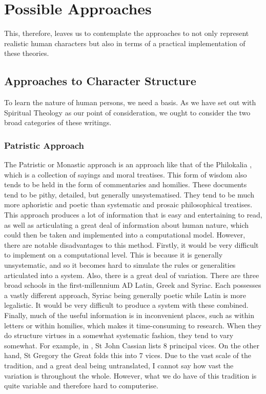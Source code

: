 \documentclass[12pt]{article}
\begin{document}
\section{Possible Approaches}
This, therefore, leaves us to contemplate the approaches to not only represent realistic human characters but also in terms of a practical implementation of these theories. 
\subsection{Approaches to Character Structure}
To learn the nature of human persons, we need a basis. As we have set out with Spiritual Theology as our point of consideration, we ought to consider the two broad categories of these writings.
\subsubsection{Patristic Approach}
The Patristic or Monastic approach is an approach like that of the Philokalia \cite{1983philokalia}, which is a collection of sayings and moral treatises. This form of wisdom also tends to be held in the form of commentaries and homilies. These documents tend to be pithy, detailed, but generally unsystematised. They tend to be much more aphoristic and poetic than systematic and prosaic philosophical treatises. This approach produces a lot of information that is easy and entertaining to read, as well as articulating a great deal of information about human nature, which could then be taken and implemented into a computational model. However, there are notable disadvantages to this method. Firstly, it would be very difficult to implement on a computational level. This is because it is generally unsystematic, and so it becomes hard to simulate the rules or generalities articulated into a system. Also, there is a great deal of variation. There are three broad schools in the first-millennium AD \: Latin, Greek and Syriac. Each possesses a vastly different approach, Syriac being generally poetic while Latin is more legalistic. It would be very difficult to produce a system with these combined. Finally, much of the useful information is in inconvenient places, such as within letters or within homilies, which makes it time-consuming to research. When they do structure virtues in a somewhat systematic fashion, they tend to vary somewhat. For example, in \cite{1983philokalia}, St John Cassian lists 8 principal vices. On the other hand, St Gregory the Great folds this into 7 vices. Due to the vast scale of the tradition, and a great deal being untranslated, I cannot say how vast the variation is throughout the whole. However, what we do have of this tradition is quite variable and therefore hard to computerise. \\
\end{document}
